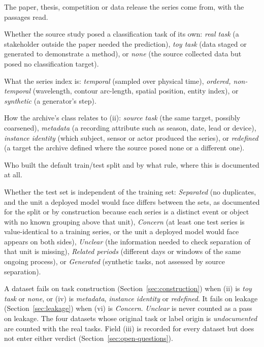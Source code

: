 \begin{description}\setlength{\itemsep}{1pt}
  \item[(i) Source publication.] The paper, thesis, competition or data release the
  series come from, with the passages read.
  \item[(ii) Original task.] Whether the source study posed a classification task of its
  own: \emph{real task} (a stakeholder outside the paper needed the prediction),
  \emph{toy task} (data staged or generated to demonstrate a method), or \emph{none}
  (the source collected data but posed no classification target).
  \item[(iii) Data origin.] What the series index is: \emph{temporal} (sampled over
  physical time), \emph{ordered, non-temporal} (wavelength, contour arc-length, spatial
  position, entity index), or \emph{synthetic} (a generator's step).
  \item[(iv) Label origin.] How the archive's class relates to (ii): \emph{source task}
  (the same target, possibly coarsened), \emph{metadata} (a recording attribute such as
  season, date, lead or device), \emph{instance identity} (which subject, sensor or
  actor produced the series), or \emph{redefined} (a target the archive defined where the
  source posed none or a different one).
  \item[(v) Split provenance.] Who built the default train/test split and by what rule,
  where this is documented at all.
  \item[(vi) Split leakage.] Whether the test set is independent of the training set:
  \emph{Separated} (no duplicates, and the unit a deployed model would face differs between the sets, as documented for the split or by construction because each series is a distinct event or object with no known grouping above that unit), \emph{Concern} (at least one test series is value-identical to a
  training series, or the unit a deployed model would face appears on both
  sides), \emph{Unclear} (the information needed to check separation of that unit is missing), \emph{Related periods} (different days or windows of the same
  ongoing process), or \emph{Generated} (synthetic tasks, not assessed by source separation).
\end{description}

A dataset fails on task construction (Section~\ref{sec:construction}) when (ii) is
\emph{toy task} or \emph{none}, or (iv) is \emph{metadata}, \emph{instance identity} or \emph{redefined}. It fails
on leakage (Section~\ref{sec:leakage}) when (vi) is \emph{Concern}.
\emph{Unclear} is never counted as a pass on leakage. The four datasets whose original task or label origin is \emph{undocumented} are counted with the real tasks. Field (iii) is recorded for every
dataset but does not enter either verdict (Section~\ref{sec:open-questions}).

